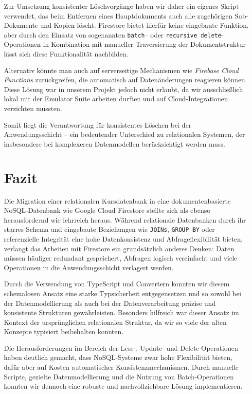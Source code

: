 \documentclass[12pt,a4paper%
              ,oneside     %
              ,titlepage
              ,DIV=13
              ,headinclude
              ,footinclude=false%
              ,cleardoublepage=empty%
              ,parskip=half,
              BCOR=0mm,
              ]{scrreprt}
\begin{document}
Zur Umsetzung konsistenter Löschvorgänge haben wir daher ein eigenes Skript verwendet, das beim Entfernen eines Hauptdokuments auch alle zugehörigen Sub-Dokumente und Kopien löscht. Firestore bietet hierfür keine eingebaute Funktion, aber durch den Einsatz von sogenannten \texttt{batch}– oder \texttt{recursive delete}-Operationen in Kombination mit manueller Traversierung der Dokumentstruktur lässt sich diese Funktionalität nachbilden.

Alternativ könnte man auch auf serverseitige Mechanismen wie \textit{Firebase Cloud Functions} zurückgreifen, die automatisch auf Datenänderungen reagieren können. Diese Lösung war in unserem Projekt jedoch nicht erlaubt, da wir ausschließlich lokal mit der Emulator Suite arbeiten durften und auf Cloud-Integrationen verzichten mussten.

Somit liegt die Verantwortung für konsistentes Löschen bei der Anwendungsschicht – ein bedeutender Unterschied zu relationalen Systemen, der insbesondere bei komplexeren Datenmodellen berücksichtigt werden muss.

\chapter{Fazit}

Die Migration einer relationalen Kursdatenbank in eine dokumentenbasierte NoSQL-Datenbank wie Google Cloud Firestore stellte sich als ebenso herausfordernd wie lehrreich heraus. Während relationale Datenbanken durch ihr starres Schema und eingebaute Beziehungen wie \texttt{JOINs}, \texttt{GROUP BY} oder referenzielle Integrität eine hohe Datenkonsistenz und Abfrageflexibilität bieten, verlangt das Arbeiten mit Firestore ein grundsätzlich anderes Denken: Daten müssen häufiger redundant gespeichert, Abfragen logisch vereinfacht und viele Operationen in die Anwendungsschicht verlagert werden.

Durch die Verwendung von TypeScript und Convertern konnten wir diesem schemalosen Ansatz eine starke Typsicherheit entgegensetzen und so sowohl bei der Datenmodellierung als auch bei der Datenverarbeitung präzise und konsistente Strukturen gewährleisten. Besonders hilfreich war dieser Ansatz im Kontext der ursprünglichen relationalen Struktur, da wir so viele der alten Konzepte typisiert beibehalten konnten.

Die Herausforderungen im Bereich der Lese-, Update- und Delete-Operationen haben deutlich gemacht, dass NoSQL-Systeme zwar hohe Flexibilität bieten, dafür aber auf Kosten automatischer Konsistenzmechanismen. Durch manuelle Scripte, gezielte Datenmodellierung und die Nutzung von Batch-Operationen konnten wir dennoch eine robuste und nachvollziehbare Lösung implementieren.
\end{document}
